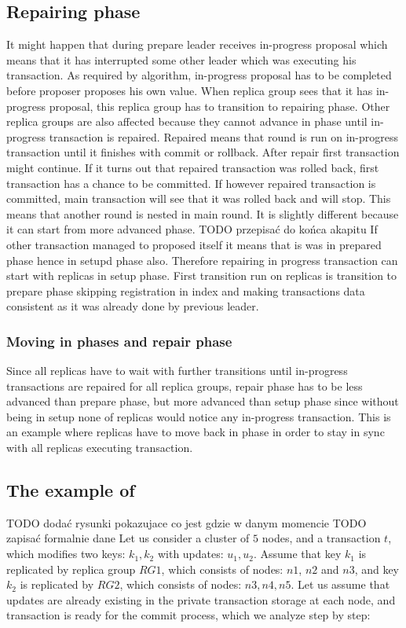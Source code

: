 \subsection{Repairing phase}
It might happen that during prepare leader receives in-progress proposal which means that it has interrupted some other leader which was executing his transaction. As required by \paxos algorithm, in-progress proposal has to be completed before proposer proposes his own value. When replica group sees that it has in-progress proposal, this replica group has to transition to repairing phase. 
Other replica groups are also affected because they cannot advance in phase until in-progress transaction is repaired. Repaired means that \mpt round is run on in-progress transaction until it finishes with commit or rollback. 
After repair first transaction might continue. If it turns out that repaired transaction was rolled back, first transaction has a chance to be committed. If however repaired transaction is committed, main transaction will see that it was rolled back and will stop.
This means that another \mpt round is nested in main \mpt round. It is slightly different because it can start from more advanced phase.
TODO przepisać do końca akapitu
If other transaction managed to proposed itself it means that is was in prepared phase hence in setupd phase also. Therefore repairing in progress transaction can start with replicas in setup phase. First transition run on replicas is transition to prepare phase skipping registration in index and making transactions data consistent as it was already done by previous leader.


\subsubsection{Moving in phases and repair phase}
Since all replicas have to wait with further transitions until in-progress transactions are repaired for all replica groups, repair phase has to be less advanced than prepare phase, but more advanced than setup phase since without being in setup none of replicas would notice any in-progress transaction. This is an example where replicas have to move back in phase in order to stay in sync with all replicas executing transaction.


\subsection{The example of \mpt}
TODO dodać rysunki pokazujace co jest gdzie w danym momencie
TODO zapisać formalnie dane
Let us consider a cluster of $5$ nodes, and a transaction $t$, which modifies two keys: $k_{1}, k_{2}$ with updates: $u_{1}, u_{2}$. Assume that key $k_{1}$ is replicated by replica group $RG1$, which consists of nodes: $n1$, $n2$ and $n3$, and key $k_{2}$ is replicated by $RG2$, which consists of nodes: $n3, n4, n5$.
Let us assume that updates are already existing in the private transaction storage at each node, and transaction is ready for the commit process, which we analyze step by step:



